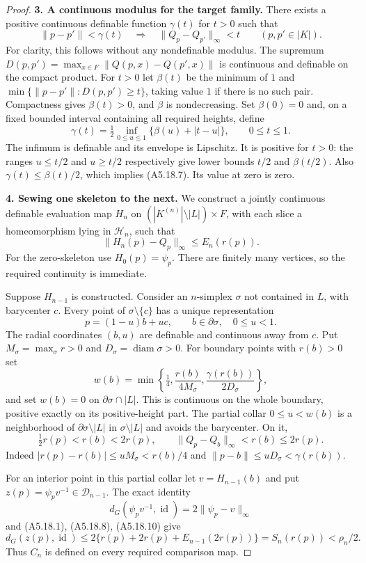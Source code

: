 \begin{proof}
\textbf{3. A continuous modulus for the target family.}\quad
There exists a positive continuous definable function $\gamma(t)$ for
$t>0$ such that
\[
 \|p-p'\|<\gamma(t)\quad\Longrightarrow\quad
 \|Q_p-Q_{p'}\|_\infty<t
 \qquad(p,p'\in|K|).
 \tag{A5.18.7}
\]
For clarity, this follows without any nondefinable modulus. The supremum
$D(p,p')=\max_{x\in F}\|Q(p,x)-Q(p',x)\|$ is continuous and definable
on the compact product. For $t>0$ let $\beta(t)$ be the minimum of $1$
and $\min\{\|p-p'\|:D(p,p')\ge t\}$, taking value $1$ if
there is no such pair. Compactness gives $\beta(t)>0$, and $\beta$ is
nondecreasing. Set $\beta(0)=0$ and, on a fixed bounded interval containing
all required heights, define
\[
 \gamma(t)=\tfrac12\inf_{0\le u\le1}\{\beta(u)+|t-u|\},
 \qquad 0\le t\le1.
\]
The infimum is definable and its envelope is Lipschitz. It is positive
for $t>0$: the ranges $u\le t/2$ and $u\ge t/2$ respectively give lower
bounds $t/2$ and $\beta(t/2)$. Also $\gamma(t)\le\beta(t)/2$, which implies
(A5.18.7). Its value at zero is zero.

\textbf{4. Sewing one skeleton to the next.}\quad
We construct a jointly continuous definable evaluation map $H_n$ on
$(|K^{(n)}|\setminus|L|)\times F$, with each slice a homeomorphism lying
in $\mathcal H_n$, such that
\[
 \|H_n(p)-Q_p\|_\infty\le E_n(r(p)).
 \tag{A5.18.8}
\]
For the zero-skeleton use $H_0(p)=\psi_p$. There are finitely many vertices,
so the required continuity is immediate.

Suppose $H_{n-1}$ is constructed. Consider an $n$-simplex $\sigma$ not
contained in $L$, with barycenter $c$. Every point of
$\sigma\setminus\{c\}$ has a unique representation
\[
 p=(1-u)b+uc,\qquad b\in\partial\sigma,\quad0\le u<1.
\]
The radial coordinates $(b,u)$ are definable and continuous away from $c$.
Put $M_\sigma=\max_\sigma r>0$ and $D_\sigma=\operatorname{diam}\sigma>0$.
For boundary points with $r(b)>0$ set
\[
 w(b)=\min\left\{\tfrac14,
       \frac{r(b)}{4M_\sigma},\frac{\gamma(r(b))}{2D_\sigma}\right\},
 \tag{A5.18.9}
\]
and set $w(b)=0$ on $\partial\sigma\cap|L|$. This is continuous on the
whole boundary, positive exactly on its positive-height part. The partial
collar $0\le u<w(b)$ is a neighborhood of
$\partial\sigma\setminus|L|$ in $\sigma\setminus|L|$ and avoids the
barycenter. On it,
\[
 \tfrac12r(p)<r(b)<2r(p),\qquad
 \|Q_p-Q_b\|_\infty<r(b)\le2r(p).
 \tag{A5.18.10}
\]
Indeed $|r(p)-r(b)|\le uM_\sigma<r(b)/4$ and
$\|p-b\|\le uD_\sigma<\gamma(r(b))$.

For an interior point in this partial collar let $v=H_{n-1}(b)$ and put
$z(p)=\psi_pv^{-1}\in\mathcal D_{n-1}$. The exact identity
\[
 d_G(\psi_pv^{-1},\operatorname{id})
       =2\|\psi_p-v\|_\infty
 \tag{A5.18.11}
\]
and (A5.18.1), (A5.18.8), (A5.18.10) give
\[
 d_G(z(p),\operatorname{id})
 \le 2\{r(p)+2r(p)+E_{n-1}(2r(p))\}
 =S_n(r(p))<\rho_n/2.
\]
Thus $C_n$ is defined on every required comparison map.


\end{proof}
